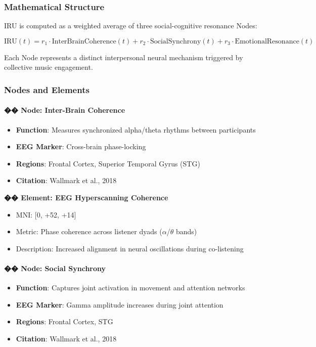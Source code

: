 \documentclass[10pt]{article}
\begin{document}
\subsubsection*{Mathematical Structure}

IRU is computed as a weighted average of three social-cognitive resonance Nodes:

\[
\text{IRU}(t) = r_1 \cdot \text{InterBrainCoherence}(t) + r_2 \cdot \text{SocialSynchrony}(t) + r_3 \cdot \text{EmotionalResonance}(t)
\]

Each Node represents a distinct interpersonal neural mechanism triggered by collective music engagement.

\subsubsection*{Nodes and Elements}

\paragraph{�� Node: Inter-Brain Coherence}

\begin{itemize}
    \item \textbf{Function}: Measures synchronized alpha/theta rhythms between participants
    \item \textbf{EEG Marker}: Cross-brain phase-locking
    \item \textbf{Regions}: Frontal Cortex, Superior Temporal Gyrus (STG)
    \item \textbf{Citation}: Wallmark et al., 2018
\end{itemize}

\textbf{�� Element: EEG Hyperscanning Coherence}

\begin{itemize}
    \item MNI: [0, +52, +14]
    \item Metric: Phase coherence across listener dyads ($\alpha$/$\theta$ bands)
    \item Description: Increased alignment in neural oscillations during co-listening
\end{itemize}

\paragraph{�� Node: Social Synchrony}

\begin{itemize}
    \item \textbf{Function}: Captures joint activation in movement and attention networks
    \item \textbf{EEG Marker}: Gamma amplitude increases during joint attention
    \item \textbf{Regions}: Frontal Cortex, STG
    \item \textbf{Citation}: Wallmark et al., 2018
\end{itemize}
\end{document}
